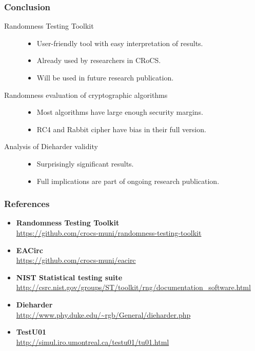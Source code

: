 \documentclass[aspectratio=169]{beamer}
\begin{document}
\begin{frame}
\frametitle{Conclusion}

\begin{description}
\item[Randomness Testing Toolkit] \hfill
\begin{itemize}
\item User-friendly tool with easy interpretation of results.
\item Already used by researchers in CRoCS.
\item Will be used in future research publication.
\end{itemize}
\vspace{.2cm}
\item[Randomness evaluation of cryptographic algorithms] \hfill
\begin{itemize}
\item Most algorithms have large enough security margins.
\item RC4 and Rabbit cipher have bias in their full version.
\end{itemize}
\vspace{.2cm}
\item[Analysis of Dieharder validity] \hfill
\begin{itemize}
\item Surprisingly significant results.
\item Full implications are part of ongoing research publication.
\end{itemize}
\end{description}

\end{frame}

\begin{frame}
\frametitle{References}

\begin{itemize}
\item \textbf{Randomness Testing Toolkit} \\ \url{https://github.com/crocs-muni/randomness-testing-toolkit}
\item \textbf{EACirc} \\ \url{https://github.com/crocs-muni/eacirc}
\item \textbf{NIST Statistical testing suite} \\ \url{http://csrc.nist.gov/groups/ST/toolkit/rng/documentation_software.html}
\item \textbf{Dieharder} \\ \url{http://www.phy.duke.edu/~rgb/General/dieharder.php}
\item \textbf{TestU01} \\ \url{http://simul.iro.umontreal.ca/testu01/tu01.html}
\end{itemize}

\end{frame}
\end{document}

